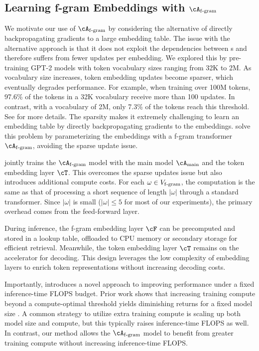 \subsection{\boldmath Learning f-gram Embeddings with $\Afgram$}
\label{subsec:train_embedding}

We motivate our use of $\Afgram$ by considering the alternative of directly backpropagating gradients to a large embedding table.
The issue with the alternative approach is that it does not exploit the dependencies between s and therefore suffers from fewer updates per embedding. We explored this by pre-training GPT-2 models with token vocabulary sizes ranging from 32K to 2M. As vocabulary size increases, token embedding updates become sparser, which eventually degrades performance.  For example, when training over 100M tokens, 97.6\% of the tokens in a 32K vocabulary receive more than 100 updates. In contrast, with a vocabulary of 2M, only 7.3\% of the tokens reach this threshold.  See  for more details. The sparsity makes it extremely challenging to learn an embedding table by directly backpropagating gradients to the embeddings.
\SCONE solve this problem by parameterizing the embeddings with a f-gram transformer $\Afgram$, avoiding the sparse update issue.


\SCONE jointly trains the $\Afgram$ model with the main model $\Amain$ and the token embedding layer $\cT$. This overcomes the sparse updates issue but also introduces additional compute costs. For each $\omega\in V_{\mathrm{f\text{-}gram}}$, the computation is the same as that of  processing a short sequence of length $|\omega|$ through a standard transformer. Since $|\omega|$ is small ($|\omega|\leq 5$ for most of our experiments), the primary overhead comes from the feed-forward layer.  


During inference, the f-gram embedding layer $\cF$ can be precomputed and stored in a lookup table, offloaded to CPU memory or secondary storage for efficient retrieval. Meanwhile, the token embedding layer $\cT$ remains on the accelerator for decoding. This design leverages the low complexity of embedding layers to enrich token representations without increasing decoding costs.

Importantly, \SCONE introduces a novel approach to improving performance under a fixed inference-time FLOPS budget. Prior work shows that increasing training compute beyond a compute-optimal threshold yields diminishing returns for a fixed model size \citep{hoffmann2022training}. A common strategy to utilize extra training compute is scaling up both model size and compute, but this typically raises inference-time FLOPS as well. In contrast, our method allows the $\Afgram$ model to benefit from greater training compute without increasing inference-time FLOPS.

